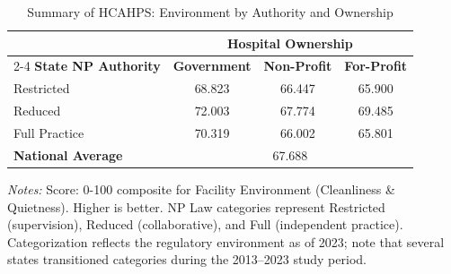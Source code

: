 \begin{table}[htbp]
    \centering
    \caption{Summary of HCAHPS: Environment by Authority and Ownership}
    \label{tab:hcahps_grp3}
    \vspace{0.2cm}
    \begin{tabular}{lccc}
        \toprule
        & \multicolumn{3}{c}{\textbf{Hospital Ownership}} \\
        \cmidrule(lr){2-4}
        \textbf{State NP Authority} & \textbf{Government} & \textbf{Non-Profit} & \textbf{For-Profit} \\
        \midrule
        Restricted & 68.823 & 66.447 & 65.900 \\
        Reduced & 72.003 & 67.774 & 69.485 \\
        Full Practice & 70.319 & 66.002 & 65.801 \\
        \midrule
        \textbf{National Average} & \multicolumn{3}{c}{67.688} \\
        \bottomrule
    \end{tabular}
    \vspace{0.1cm}
    \begin{minipage}{0.85\textwidth}
        \footnotesize \textit{Notes:} Score: 0-100 composite for Facility Environment (Cleanliness \& Quietness). Higher is better. NP Law categories represent Restricted (supervision), Reduced (collaborative), and Full (independent practice). Categorization reflects the regulatory environment as of 2023; note that several states transitioned categories during the 2013--2023 study period.
    \end{minipage}
\end{table}
